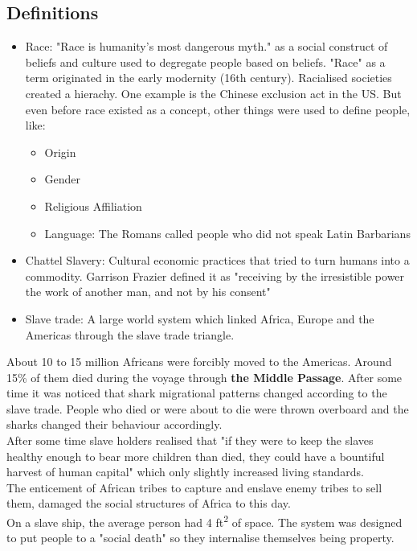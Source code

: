 \documentclass{article}
\begin{document}
	\subsection{Definitions}
	\begin{itemize}
		\item{Race: "Race is humanity's most dangerous myth." as a social construct of beliefs and culture used to degregate people based on beliefs. "Race" as a term originated in the early modernity (16th century). Racialised societies created a hierachy. One example is the Chinese exclusion act in the US. But even before race existed as a concept, other things were used to define people, like:
		\begin{itemize}
			\item{Origin}
			\item{Gender}
			\item{Religious Affiliation}
			\item{Language: The Romans called people who did not speak Latin Barbarians}
		\end{itemize}}
		\item{Chattel Slavery: Cultural economic practices that tried to turn humans into a commodity. Garrison Frazier defined it as "receiving by the irresistible power the work of another man, and not by his consent" }
		\item{Slave trade: A large world system which linked Africa, Europe and the Americas through the slave trade triangle.}
	\end{itemize}
	About 10 to 15 million Africans were forcibly moved to the Americas. Around 15\% of them died during the voyage through \textbf{the Middle Passage}. After some time it was noticed that shark migrational patterns changed according to the slave trade. People who died or were about to die were thrown overboard and the sharks changed their behaviour accordingly. \\
	After some time slave holders realised that "if they were to keep the slaves healthy enough to bear more children than died, they could have a bountiful harvest of human capital" which only slightly increased living standards. \\
	The enticement of African tribes to capture and enslave enemy tribes to sell them, damaged the social structures of Africa to this day. \\
	On a slave ship, the average person had 4 ft\textsuperscript{2} of space. The system was designed to put people to a "social death" so they internalise themselves being property. \\
\end{document}
